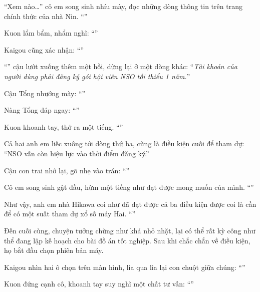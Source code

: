 \documentclass[../main.tex]{subfiles}
\begin{document}
``Xem nào\dots'' cô em song sinh nhíu mày, đọc những dòng thông tin trên trang chính thức của nhà Nin. ``''

Kuon lẩm bẩm, nhẩm nghĩ: ``''

Kaigou cũng xác nhận: ``''

``'' cậu lướt xuống thêm một hồi, dừng lại ở một dòng khác: ``\emph{Tài khoản của người dùng phải đăng ký gói hội viên NSO tối thiểu 1 năm.}''

Cậu Tổng nhướng mày: ``''

Nàng Tổng đáp ngay: ``''

Kuon khoanh tay, thở ra một tiếng. ``''

Cả hai anh em liếc xuông tới dòng thứ ba, cũng là điều kiện cuối để tham dự: ``NSO vẫn còn hiệu lực vào thời điểm đăng ký.''

Cậu con trai nhớ lại, gõ nhẹ vào trán: ``''

Cô em song sinh gật đầu, hừm một tiếng như đạt được mong muốn của mình. ``''

Như vậy, anh em nhà Hikawa coi như đã đạt được cả ba điều kiện được coi là cần để có một suất tham dự xổ số máy Hai. ``''

Đến cuối cùng, chuyện tưởng chừng như khá nhỏ nhặt, lại có thể rất kỳ công như thể đang lập kế hoạch cho bài đồ án tốt nghiệp. Sau khi chắc chắn về điều kiện, họ bắt đầu chọn phiên bản máy.

Kaigou nhìn hai ô chọn trên màn hình, lia qua lia lại con chuột giữa chúng: ``''

Kuon đứng cạnh cô, khoanh tay suy nghĩ một chất tư vấn: ``''
\end{document}
